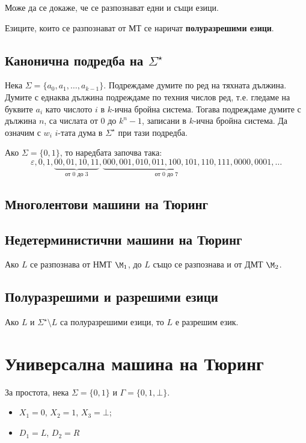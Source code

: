 Може да се докаже, че се разпознават едни и същи езици.

Езиците, които се разпознават от МТ се наричат {\bf полуразрешими езици}.

\subsection*{Канонична подредба на $\Sigma^\star$}

Нека $\Sigma = \{a_0,a_1,\dots,a_{k-1}\}$.
Подреждаме думите по ред на тяхната дължина.
Думите с еднаква дължина подреждаме по техния числов ред, т.е.
гледаме на буквите $a_i$ като числото $i$ в $k$-ична бройна система.
Тогава подреждаме думите с дължина $n$, са числата от $0$ до $k^n-1$,
записани в $k$-ична бройна система.
Да означим с $w_i$ $i$-тата дума в $\Sigma^\star$ при тази подредба.

\begin{example}
  Ако $\Sigma = \{0,1\}$, то наредбата започва така:
  \[\varepsilon, 0, 1, \underbrace{00, 01, 10, 11}_{\text{от $0$ до $3$}}, \underbrace{000, 001, 010, 011, 100, 101, 110, 111}_{\text{от $0$ до $7$}}, 0000, 0001, \dots\]  
\end{example}

\subsection*{Многолентови машини на Тюринг}

\subsection*{Недетерминистични машини на Тюринг}

\begin{thm}
  Ако $L$ се разпознава от НМТ $\M_1$, до $L$
  също се разпознава и от ДМТ $\M_2$.
\end{thm}

\subsection*{Полуразрешими и разрешими езици}

\begin{thm}
  Ако $L$ и $\Sigma^\star \setminus L$ са полуразрешими езици, то $L$ е разрешим език.
\end{thm}

\section{Универсална машина на Тюринг}
За простота, нека $\Sigma = \{0,1\}$ и $\Gamma = \{0,1,\bot\}$.
\begin{itemize}
\item 
  $X_1 = 0$, $X_2 = 1$, $X_3 = \bot$;
\item
  $D_1 = L$, $D_2 = R$
\end{itemize}

